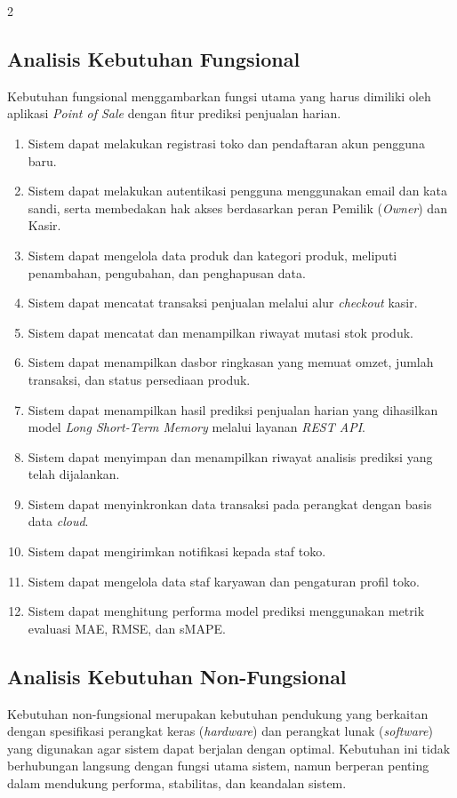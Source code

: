\documentclass[12pt, a4paper, onecolumn, oneside]{report}
\begin{document}
\begin{spacing}{2}
\subsection{Analisis Kebutuhan Fungsional}

Kebutuhan fungsional menggambarkan fungsi utama yang harus dimiliki oleh aplikasi \textit{Point of Sale} dengan fitur prediksi penjualan harian.
\begin{enumerate}
    \item Sistem dapat melakukan registrasi toko dan pendaftaran akun pengguna baru.
    \item Sistem dapat melakukan autentikasi pengguna menggunakan email dan kata sandi, serta membedakan hak akses berdasarkan peran Pemilik (\textit{Owner}) dan Kasir.
    \item Sistem dapat mengelola data produk dan kategori produk, meliputi penambahan, pengubahan, dan penghapusan data.
    \item Sistem dapat mencatat transaksi penjualan melalui alur \textit{checkout} kasir.
    \item Sistem dapat mencatat dan menampilkan riwayat mutasi stok produk.
    \item Sistem dapat menampilkan dasbor ringkasan yang memuat omzet, jumlah transaksi, dan status persediaan produk.
    \item Sistem dapat menampilkan hasil prediksi penjualan harian yang dihasilkan model \textit{Long Short-Term Memory} melalui layanan \textit{REST API}.
    \item Sistem dapat menyimpan dan menampilkan riwayat analisis prediksi yang telah dijalankan.
    \item Sistem dapat menyinkronkan data transaksi pada perangkat dengan basis data \textit{cloud}.
    \item Sistem dapat mengirimkan notifikasi kepada staf toko.
    \item Sistem dapat mengelola data staf karyawan dan pengaturan profil toko.
    \item Sistem dapat menghitung performa model prediksi menggunakan metrik evaluasi MAE, RMSE, dan sMAPE.
\end{enumerate}

\subsection{Analisis Kebutuhan Non-Fungsional}

Kebutuhan non-fungsional merupakan kebutuhan pendukung yang berkaitan dengan spesifikasi perangkat keras (\textit{hardware}) dan perangkat lunak (\textit{software}) yang digunakan agar sistem dapat berjalan dengan optimal. Kebutuhan ini tidak berhubungan langsung dengan fungsi utama sistem, namun berperan penting dalam mendukung performa, stabilitas, dan keandalan sistem.


\end{spacing}
\end{document}
